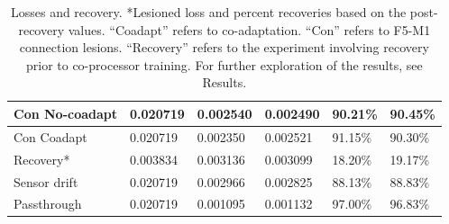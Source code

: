 \documentclass[12pt]{iopart}
\begin{document}
\begin{table}[h]
\begin{tabular}{|l|l|l|l|l|l|}
Con No-coadapt & 0.020719                                                          & 0.002540                                                         & 0.002490                                                             & 90.21\%            & 90.45\%                                                          \\ \hline
Con Coadapt    & 0.020719                                                          & 0.002350                                                         & 0.002521                                                             & 91.15\%            & 90.30\%                                                          \\ \hline
Recovery*      & 0.003834                                                          & 0.003136                                                         & 0.003099                                                             & 18.20\%            & 19.17\%                                                          \\ \hline
Sensor drift   & 0.020719                                                          & 0.002966                                                        & 0.002825                                                              & 88.13\%            & 88.83\%                                                          \\ \hline
Passthrough    & 0.020719                                                          & 0.001095                                                        & 0.001132                                                              & 97.00\%            & 96.83\%                                                          \\ \hline
\end{tabular}
\caption{\label{tab:results}Losses and recovery. *Lesioned loss and percent recoveries based on the post-recovery values.
         ``Coadapt'' refers to co-adaptation. ``Con'' refers to F5-M1 connection lesions. ``Recovery'' refers to the
         experiment involving recovery prior to co-processor training. For further exploration of the results, see Results.}
\end{table}
\end{document}
